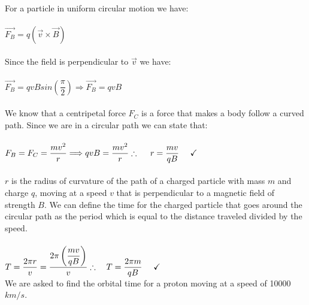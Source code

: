 \documentclass[fleqn]{article}
\begin{document}
\begin{enumerate}
      \textcolor{hwColor}{
        \\
        For a particle in uniform circular motion we have:
        \\
        \\
        $
          \overrightarrow{F_B}=q \left(
            \overrightarrow{v} \times \overrightarrow{B}
          \right)
        $
        \\
        \\
        Since the field is perpendicular to $\overrightarrow{v}$ we have:
        \\
        \\
        $
          \overrightarrow{F_B}=q v B sin(\dfrac{\pi}{2}) \Longrightarrow \overrightarrow{F_B}=q v B
        $
        \\
        \\
        We know that a centripetal force $F_C$ is a force that makes a body follow a curved path. Since we are in a circular path we can state that:
        \\
        \\
        $
          F_B=F_C=\dfrac{mv^2}{r} \Longrightarrow q v B=\dfrac{mv^2}{r}
          \\
          \\
          \\
          \therefore ~~~~  r=\dfrac{mv}{qB} ~~~~ \checkmark
        $
        \\
        \\
        $r$ is the radius of curvature of the path of a charged particle with mass $m$ and charge $q$, moving at a speed $v$ that is 
        perpendicular to a magnetic field of strength $B$. We can define the time for the charged particle that goes around the circular path
        as the period which is equal to the distance traveled divided by the speed.
        \\
        \\
        $
          T=\dfrac{2 \pi r}{v}=\dfrac{2 \pi \left(\dfrac{mv}{qB}\right)}{v}
          \\
          \\
          \\
          \therefore ~~~ T=\dfrac{2 \pi m}{q B} ~~~~ \checkmark
          \\
        $
        \\
        We are asked to find the orbital time for a proton moving at a speed of 10000 $km/s$.
        \\
        \\
}
\end{enumerate}
\end{document}
